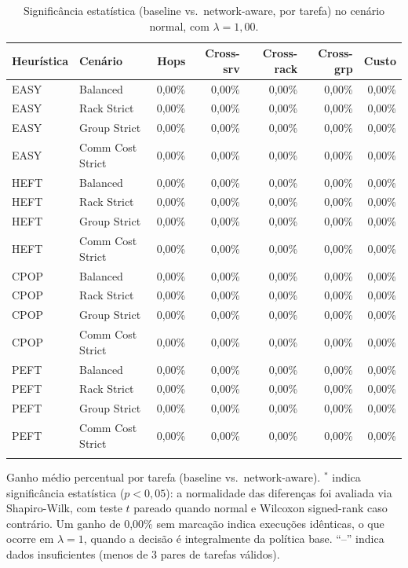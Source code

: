 \begin{table}[htbp]
\centering
\small
\caption{Significância estatística (baseline vs.\ network-aware, por tarefa) no cenário normal, com $\lambda = 1{,}00$.}
\label{tab:significancia_normal_lambda_100}
\begin{tabular}{llrrrrr}
\toprule
Heurística & Cenário & Hops & Cross-srv & Cross-rack & Cross-grp & Custo \\
\midrule
EASY & Balanced & 0,00\% & 0,00\% & 0,00\% & 0,00\% & 0,00\% \\
EASY & Rack Strict & 0,00\% & 0,00\% & 0,00\% & 0,00\% & 0,00\% \\
EASY & Group Strict & 0,00\% & 0,00\% & 0,00\% & 0,00\% & 0,00\% \\
EASY & Comm Cost Strict & 0,00\% & 0,00\% & 0,00\% & 0,00\% & 0,00\% \\
\addlinespace
HEFT & Balanced & 0,00\% & 0,00\% & 0,00\% & 0,00\% & 0,00\% \\
HEFT & Rack Strict & 0,00\% & 0,00\% & 0,00\% & 0,00\% & 0,00\% \\
HEFT & Group Strict & 0,00\% & 0,00\% & 0,00\% & 0,00\% & 0,00\% \\
HEFT & Comm Cost Strict & 0,00\% & 0,00\% & 0,00\% & 0,00\% & 0,00\% \\
\addlinespace
CPOP & Balanced & 0,00\% & 0,00\% & 0,00\% & 0,00\% & 0,00\% \\
CPOP & Rack Strict & 0,00\% & 0,00\% & 0,00\% & 0,00\% & 0,00\% \\
CPOP & Group Strict & 0,00\% & 0,00\% & 0,00\% & 0,00\% & 0,00\% \\
CPOP & Comm Cost Strict & 0,00\% & 0,00\% & 0,00\% & 0,00\% & 0,00\% \\
\addlinespace
PEFT & Balanced & 0,00\% & 0,00\% & 0,00\% & 0,00\% & 0,00\% \\
PEFT & Rack Strict & 0,00\% & 0,00\% & 0,00\% & 0,00\% & 0,00\% \\
PEFT & Group Strict & 0,00\% & 0,00\% & 0,00\% & 0,00\% & 0,00\% \\
PEFT & Comm Cost Strict & 0,00\% & 0,00\% & 0,00\% & 0,00\% & 0,00\% \\
\addlinespace
\bottomrule
\end{tabular}

\vspace{2mm}
\footnotesize Ganho médio percentual por tarefa (baseline vs.\ network-aware). $^{*}$ indica significância estatística ($p<0{,}05$): a normalidade das diferenças foi avaliada via Shapiro-Wilk, com teste $t$ pareado quando normal e Wilcoxon signed-rank caso contrário. Um ganho de 0,00\% sem marcação indica execuções idênticas, o que ocorre em $\lambda = 1$, quando a decisão é integralmente da política base. ``--'' indica dados insuficientes (menos de 3 pares de tarefas válidos).
\end{table}
